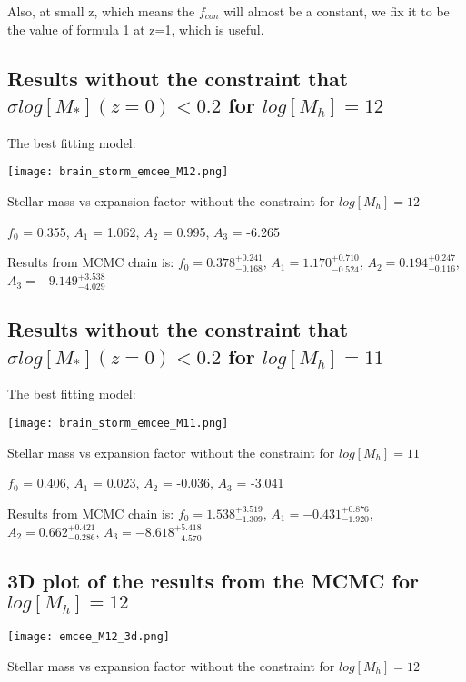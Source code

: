 \documentclass[ajp]{article}   	%
\begin{document}
Also, at small z, which means the $f_{con}$ will almost be a constant, we fix it to be the value of formula 1 at z=1, which is useful.


\subsection{Results without the constraint that $\sigma log[M_*](z=0) <0.2$ for $log[M_h]=12$}
The best fitting model:

\begin{center}
\texttt{[image: brain\_storm\_emcee\_M12.png]}

\centerline{Stellar mass vs expansion factor without the constraint for $log[M_h]=12$}
\end{center}

$f_0$ = 0.355, $A_1$ = 1.062, $A_2$ = 0.995, $A_3$ = -6.265

\bigskip


Results from MCMC chain\cite{foreman2013emcee} is:
$f_0=0.378^{+0.241}_{-0.168}$, $A_1=1.170^{+0.710}_{-0.524}$, $A_2=0.194^{+0.247}_{-0.116}$, $A_3 = -9.149^{+3.538}_{-4.029}$


\subsection{Results without the constraint that $\sigma log[M_*](z=0) <0.2$ for $log[M_h]=11$}
The best fitting model:

\begin{center}
\texttt{[image: brain\_storm\_emcee\_M11.png]}

\centerline{Stellar mass vs expansion factor without the constraint for $log[M_h]=11$}
\end{center}

$f_0$ = 0.406, $A_1$ = 0.023, $A_2$ = -0.036, $A_3$ = -3.041

\bigskip


Results from MCMC chain is:
$f_0=1.538^{+3.519}_{-1.309}$, $A_1=-0.431^{+0.876}_{-1.920}$, $A_2=0.662^{+ 0.421}_{-0.286}$, $A_3 = -8.618^{+5.418}_{-4.570}$


\subsection{3D plot of the results from the MCMC for $log[M_h]=12$}


\begin{center}
\texttt{[image: emcee\_M12\_3d.png]}

\centerline{Stellar mass vs expansion factor without the constraint for $log[M_h]=12$}
\end{center}
\end{document}
